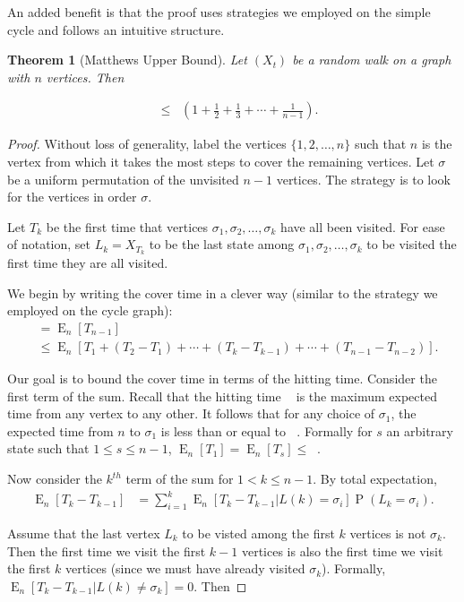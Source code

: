 \documentclass[12pt]{article}
\newtheorem{theorem}{Theorem}
\theoremstyle{definition}
\DeclareMathOperator{\E}{\mathrm{E}}		     %
\DeclareMathOperator{\pr}{\mathrm{P}}		     %
\DeclareMathOperator{\tcov}{t_\textrm{cov}}      %
\DeclareMathOperator{\hit}{t_{\textrm{hit}}}     %
\begin{document}
An added benefit is that the proof uses strategies we employed on the
simple cycle and follows an intuitive structure.

\begin{theorem}[Matthews Upper Bound]
Let $(X_t)$ be a random walk on a graph with $n$ vertices. Then \label{thm:matthews_up}
\end{theorem}
\begin{align}
\tcov &\leq \hit \left(1 + \frac{1}{2} + \frac{1}{3} + \cdots + \frac{1}{n-1} \right). \nonumber
\end{align}

\begin{proof}
Without loss of generality, label the vertices $\{1, 2, \dots, n\}$
such that $n$ is the vertex from which it takes the most steps to cover
the remaining vertices.
Let $\sigma$ be a uniform permutation of the unvisited $n-1$ vertices.
The strategy is to look for the vertices in order $\sigma$.

Let $T_k$ be the first time that vertices $\sigma_1, \sigma_2, \ldots, \sigma_k$
have all been visited.
For ease of notation, set $L_k = X_{T_k}$ to be the last state among 
$\sigma_1, \sigma_2, \ldots, \sigma_k$ to be visited the first
time they are all visited.

We begin by writing the cover time in a clever way
(similar to the strategy we employed on the cycle graph):
\begin{align}
\tcov &= \E_n[{T_{n-1}}]  \nonumber \\
&\leq \E_n[T_1 + (T_2 - T_1) + \cdots + 
(T_k - T_{k-1}) + \cdots + (T_{n-1} - T_{n-2})] . \nonumber
\end{align}

Our goal is to bound the cover time in terms of the hitting time.
Consider the first term of the sum.
Recall that the hitting time $\hit$ is the maximum
expected time from any vertex to any other.
It follows that for any choice of $\sigma_1$,
the expected time from $n$ to $\sigma_1$ is less than or equal to $\hit$.
Formally for $s$ an arbitrary state such that $1\leq s \leq n-1$,
$\E_n[T_1] = \E_n[T_s] \leq \hit$.

Now consider the $k^{th}$ term of the sum for $1 < k \leq n-1$.
By total expectation,
\begin{align}
\E_n[T_k - T_{k-1}] &=
\sum_{i=1}^k \E_n[T_k - T_{k-1} | L(k) = \sigma_i]
\pr(L_k = \sigma_i). \nonumber 
\end{align}

Assume that the last vertex $L_k$ to be visted among the first
$k$ vertices is not $\sigma_k$.
Then the first time we visit the first $k-1$ vertices
is also the first time we visit the first $k$ vertices
(since we must have already visited $\sigma_k$).
Formally, $\E_n[T_k-T_{k-1}|L(k) \neq \sigma_k] = 0$.
Then 


\end{proof}
\end{document}
